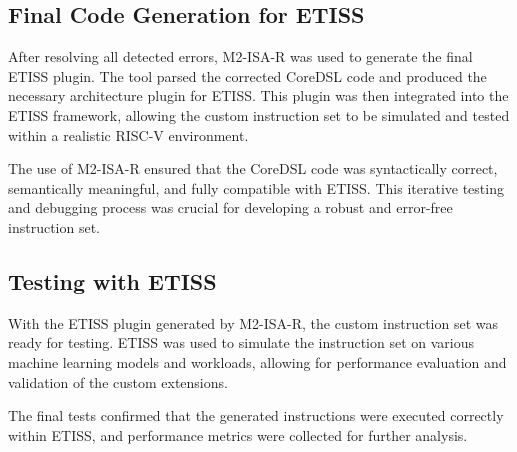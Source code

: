 \subsection{Final Code Generation for ETISS}

After resolving all detected errors, M2-ISA-R was used to generate the final ETISS plugin. The tool parsed the corrected CoreDSL code and produced the necessary architecture plugin for ETISS. This plugin was then integrated into the ETISS framework, allowing the custom instruction set to be simulated and tested within a realistic RISC-V environment.

The use of M2-ISA-R ensured that the CoreDSL code was syntactically correct, semantically meaningful, and fully compatible with ETISS. This iterative testing and debugging process was crucial for developing a robust and error-free instruction set.

\subsection{Testing with ETISS}

With the ETISS plugin generated by M2-ISA-R, the custom instruction set was ready for testing. ETISS was used to simulate the instruction set on various machine learning models and workloads, allowing for performance evaluation and validation of the custom extensions.

The final tests confirmed that the generated instructions were executed correctly within ETISS, and performance metrics were collected for further analysis.
